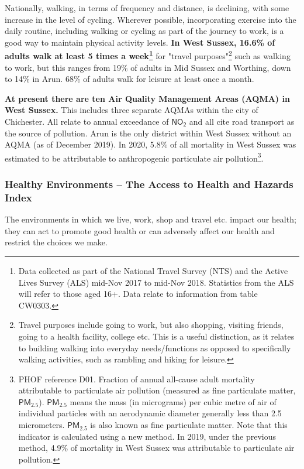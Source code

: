 Nationally, walking, in terms of frequency and distance, is declining, with some increase in the level of cycling. Wherever possible, incorporating exercise into the daily routine, including walking or cycling as part of the journey to work, is a good way to maintain physical activity levels. {\bf In West Sussex, 16.6\% of adults walk at least 5 times a week\footnote{Data collected as part of the National Travel Survey (NTS) and the Active Lives Survey (ALS) mid-Nov 2017 to mid-Nov 2018. Statistics from the ALS will refer to those aged 16+. Data relate to information from table CW0303.}} for "travel purposes"\footnote{Travel purposes include going to work, but also shopping, visiting friends, going to a health facility, college etc. This is a useful distinction, as it relates to building walking into everyday needs/functions as opposed to specifically walking activities, such as rambling and hiking for leisure.} such as walking to work, but this ranges from 19\% of adults in Mid Sussex and Worthing, down to 14\% in Arun. 68\% of adults walk for leisure at least once a month.

{\bf At present there are ten Air Quality Management Areas (AQMA) in West Sussex.} This includes three separate AQMAs within the city of Chichester. All relate to annual exceedance of $\mathsf{NO_2}$ and all cite road transport as the source of pollution. Arun is the only district within West Sussex without an AQMA (as of December 2019). In 2020, 5.8\% of all mortality in West Sussex was estimated to be attributable to anthropogenic particulate air pollution\footnote{PHOF reference D01. Fraction of annual all-cause adult mortality attributable to particulate air pollution (measured as fine particulate matter, $\mathsf{PM_{2.5}}$). $\mathsf{PM_{2.5}}$ means the mass (in micrograms) per cubic metre of air of individual particles with an aerodynamic diameter generally less than 2.5 micrometers. $\mathsf{PM_{2.5}}$ is also known as fine particulate matter. Note that this indicator is calculated using a new method. In 2019, under the previous method, 4.9\% of mortality in West Sussex was attributable to particulate air pollution.}.

\subsubsection{Healthy Environments -- The Access to Health and Hazards Index}

The environments in which we live, work, shop and travel etc. impact our health; they can act to promote good health or can adversely affect our health and restrict the choices we make.

